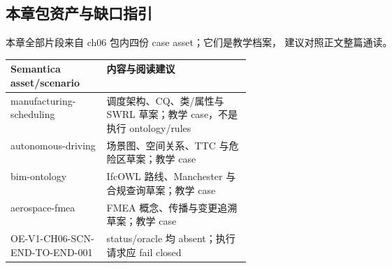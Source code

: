\subsection*{本章包资产与缺口指引}

本章全部片段来自 ch06 包内四份 case asset；它们是教学档案，
建议对照正文整篇通读。

\begin{center}
\begin{tabularx}{\linewidth}{@{}>{\ttfamily\footnotesize}p{0.40\linewidth}X@{}}
\toprule
\normalfont\textbf{Semantica asset/scenario} & \textbf{内容与阅读建议} \\
\midrule
manufacturing-scheduling & 调度架构、CQ、类/属性与 SWRL 草案；教学 case，不是执行 ontology/rules \\
autonomous-driving & 场景图、空间关系、TTC 与危险区草案；教学 case \\
bim-ontology & IfcOWL 路线、Manchester 与合规查询草案；教学 case \\
aerospace-fmea & FMEA 概念、传播与变更追溯草案；教学 case \\
OE-V1-CH06-SCN-END-TO-END-001 & status/oracle 均 absent；执行请求应 fail closed \\
\bottomrule
\end{tabularx}
\end{center}
